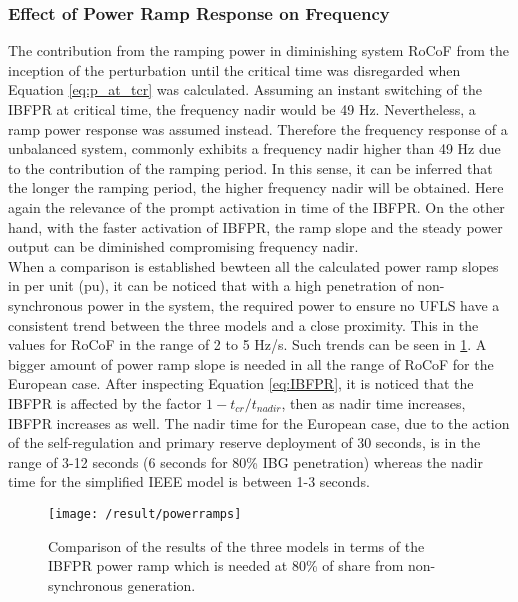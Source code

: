 \subsubsection{Effect of Power Ramp Response on Frequency}

The contribution from the ramping power in diminishing system RoCoF from the inception of the perturbation until the critical time was disregarded when Equation \eqref{eq:p_at_tcr} was calculated. Assuming an instant switching of the IBFPR at critical time, the frequency nadir would be 49 Hz. Nevertheless, a ramp power response was assumed instead. Therefore the frequency response of a unbalanced system, commonly exhibits a frequency nadir higher than 49 Hz due to the contribution of the ramping period. In this sense, it can be inferred that the longer the ramping period, the higher frequency nadir will be obtained. Here again the relevance of the prompt activation in time of the IBFPR. On the other hand, with the faster activation of IBFPR, the ramp slope and the steady power output can be diminished compromising frequency nadir.\\ 

When a comparison is established bewteen all the calculated power ramp slopes in per unit (pu), it can be noticed that with a high penetration of non-synchronous power in the system, the required power to ensure no UFLS have a consistent trend between the three models and a close proximity. This in the values for RoCoF in the range of 2 to 5 Hz/s. Such trends can be seen in \ref{fig:res_pramp}. A bigger amount of power ramp slope is needed in all the range of RoCoF for the European case. After inspecting Equation \ref{eq:IBFPR}, it is noticed that the IBFPR is affected by the factor $ 1-t_{cr} /t_{nadir} $, then as nadir time increases, IBFPR increases as well. The nadir time for the European case, due to the action of the self-regulation and primary reserve deployment of 30 seconds, is in the range of 3-12 seconds (6 seconds for 80\% IBG penetration) whereas the nadir time for the simplified IEEE model is between 1-3 seconds.\\

\begin{figure}[h]
	\centering
	\texttt{[image: /result/powerramps]}
	\caption{Comparison of the results of the three models in terms of the IBFPR power ramp which is needed at 80\% of share from non-synchronous generation.}
	\label{fig:res_pramp}
\end{figure}

